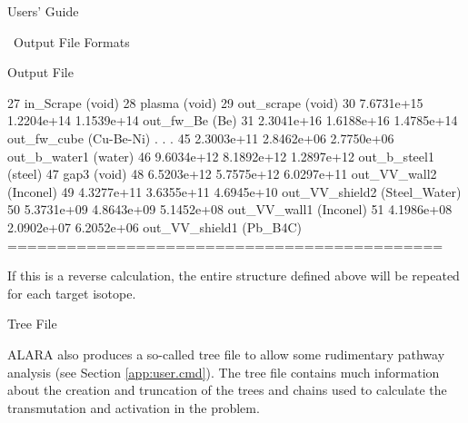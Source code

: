\begin{chapter}{Users' Guide\label{app:user.guide}}
\begin{section}{\ALARA\ Output File Formats\label{app:user.output}}
\begin{subsection}{Output File}
\begin{center}
\begin{boxedverbatim}
27      in_Scrape (void)                    
28      plasma (void)                       
29      out_scrape (void)                   
30      7.6731e+15  1.2204e+14  1.1539e+14  out_fw_Be (Be)
31      2.3041e+16  1.6188e+16  1.4785e+14  out_fw_cube (Cu-Be-Ni)
.
.
.
45      2.3003e+11  2.8462e+06  2.7750e+06  out_b_water1 (water)
46      9.6034e+12  8.1892e+12  1.2897e+12  out_b_steel1 (steel)
47      gap3 (void)                         
48      6.5203e+12  5.7575e+12  6.0297e+11  out_VV_wall2 (Inconel)
49      4.3277e+11  3.6355e+11  4.6945e+10  out_VV_shield2 (Steel_Water)
50      5.3731e+09  4.8643e+09  5.1452e+08  out_VV_wall1 (Inconel)
51      4.1986e+08  2.0902e+07  6.2052e+06  out_VV_shield1 (Pb_B4C)
============================================
\end{boxedverbatim}
      \end{center}

      If this is a reverse calculation, the entire structure defined
      above will be repeated for each target isotope.
    \end{subsection}

    \begin{subsection}{Tree File\label{app:user.output.tree}}
      
      ALARA also produces a so-called tree file to allow some
      rudimentary pathway analysis (see Section \ref{app:user.cmd}).
      The tree file contains much information about the creation and
      truncation of the trees and chains used to calculate the
      transmutation and activation in the problem.
      

\end{subsection}
\end{section}
\end{chapter}
